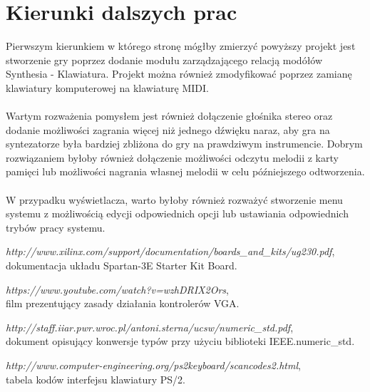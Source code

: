 \documentclass[a4paper]{report}
\begin{document}
	\section{Kierunki dalszych prac}
	Pierwszym kierunkiem w którego stronę mógłby zmierzyć powyższy projekt jest stworzenie gry poprzez dodanie modułu zarządzającego relacją modółów Synthesia - Klawiatura. Projekt można również zmodyfikować poprzez zamianę klawiatury komputerowej na klawiaturę MIDI. \\\\Wartym rozważenia pomysłem jest również dołączenie głośnika stereo oraz dodanie możliwości zagrania więcej niż jednego dźwięku naraz, aby gra na syntezatorze była bardziej zbliżona do gry na prawdziwym instrumencie. Dobrym rozwiązaniem byłoby również dołączenie możliwości odczytu melodii z karty pamięci lub możliwości nagrania własnej melodii w celu późniejszego odtworzenia.\\\\W przypadku wyświetlacza, warto byłoby również rozważyć stworzenie menu systemu z możliwością edycji odpowiednich opcji lub ustawiania odpowiednich trybów pracy systemu.
	
\begin{thebibliography}{999}
		{\em http://www.xilinx.com/support/documentation/boards\_and\_kits/ug230.pdf}, \\
		dokumentacja układu Spartan-3E Starter Kit Board.
	
		{\em https://www.youtube.com/watch?v=wzhDRIX2Ors}, \\
		film prezentujący zasady działania kontrolerów VGA.
		
		{\em http://staff.iiar.pwr.wroc.pl/antoni.sterna/ucsw/numeric\_std.pdf}, \\
		dokument opisujący konwersje typów przy użyciu biblioteki IEEE.numeric\_std.
		
		{\em http://www.computer-engineering.org/ps2keyboard/scancodes2.html}, \\
		tabela kodów interfejsu klawiatury PS/2.
		
	\end{thebibliography}	

\begin{appendix}
	\listoffigures
\end{appendix}
\end{document}

